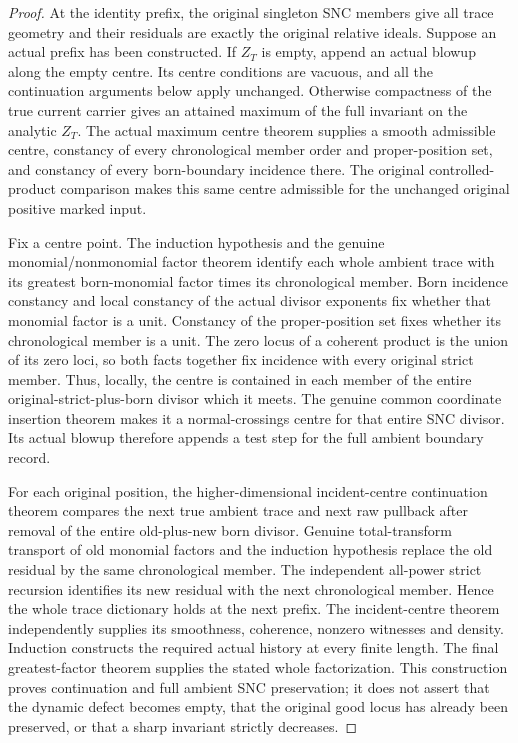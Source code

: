 \begin{proof}
At the identity prefix, the original singleton SNC members give all trace
geometry and their residuals are exactly the original relative ideals.
Suppose an actual prefix has been constructed.  If $Z_T$ is empty, append
an actual blowup along the empty centre.  Its centre conditions
are vacuous, and all the continuation arguments below apply unchanged.
Otherwise compactness of the true current carrier gives an attained
maximum of the full invariant on the analytic $Z_T$.  The actual maximum
centre theorem supplies a smooth admissible centre, constancy of every
chronological member order and proper-position set, and constancy of
every born-boundary incidence there.  The original controlled-product
comparison makes this same centre admissible for the unchanged original
positive marked input.

Fix a centre point.  The induction hypothesis and the genuine
monomial/nonmonomial factor theorem identify each whole ambient trace
with its greatest born-monomial factor times its chronological member.
Born incidence constancy and local constancy of the actual divisor
exponents fix whether that monomial factor is a unit.  Constancy of the
proper-position set fixes whether its chronological member is a unit.
The zero locus of a coherent product is the union of its zero loci, so
both facts together fix incidence with every original strict member.
Thus, locally, the centre is contained in each member of the entire
original-strict-plus-born divisor which it meets.  The genuine common
coordinate insertion theorem makes it a normal-crossings centre for
that entire SNC divisor.  Its actual blowup therefore appends a test
step for the full ambient boundary record.

For each original position, the higher-dimensional incident-centre
continuation theorem compares the next true ambient trace and next raw
pullback after removal of the entire old-plus-new born divisor.  Genuine
total-transform transport of old monomial factors and the induction
hypothesis replace the old residual by the same chronological member.
The independent all-power strict recursion identifies its new residual
with the next chronological member.  Hence the whole trace dictionary
holds at the next prefix.  The incident-centre theorem independently
supplies its smoothness, coherence, nonzero witnesses and density.
Induction constructs the required actual history at every finite length.
The final greatest-factor theorem supplies the stated whole factorization.
This construction proves continuation and full ambient SNC preservation;
it does not assert that the dynamic defect becomes empty, that the
original good locus has already been preserved, or that a sharp invariant
strictly decreases.
\end{proof}
